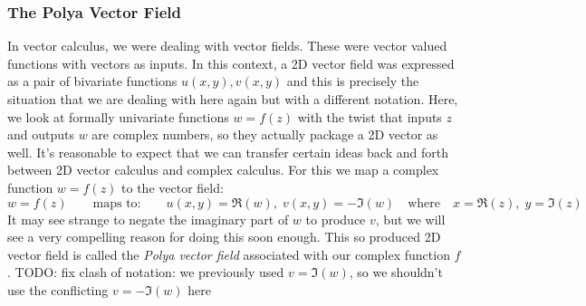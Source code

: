 


\subsubsection{The Polya Vector Field}
In vector calculus, we were dealing with vector fields. These were vector valued functions with vectors as inputs. In this context, a 2D vector field was expressed as a pair of bivariate functions $u(x,y), v(x,y)$ and this is precisely the situation that we are dealing with here again but with a different notation. Here, we look at formally univariate functions $w = f(z)$ with the twist that inputs $z$ and outputs $w$ are complex numbers, so they actually package a 2D vector as well. It's reasonable to expect that we can transfer certain ideas back and forth between 2D vector calculus and complex calculus. For this we map a complex function $w = f(z)$ to the vector field:
\begin{equation}
w = f(z)
\qquad \text{maps to:} \qquad
u(x,y) = \Re(w), \; v(x,y) = -\Im(w)
\quad \text{where} \quad
x = \Re(z), \; y = \Im(z)
\end{equation}
It may see strange to negate the imaginary part of $w$ to produce $v$, but we will see a very compelling reason for doing this soon enough. This so produced 2D vector field is called the \emph{Polya vector field} associated with our complex function $f$. TODO: fix clash of notation: we previously used $v = \Im(w)$, so we shouldn't use the conflicting $v = -\Im(w)$ here








